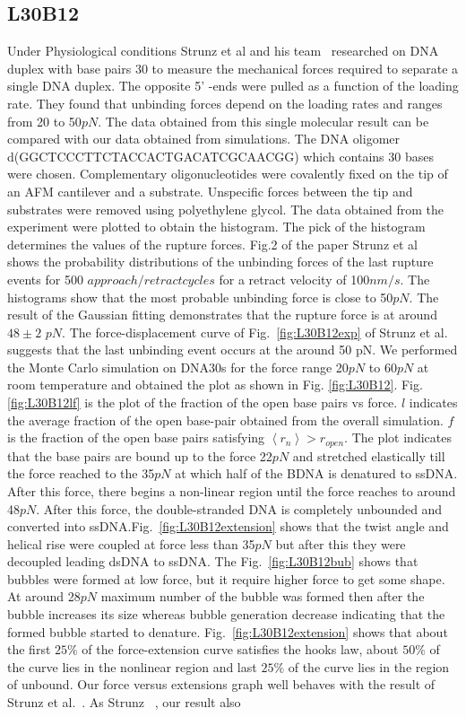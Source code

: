 \documentclass[12pt,masters,final]{UTRGVthesis}
\begin{document}
\subsection{L30B12}
  Under Physiological conditions Strunz et al and his team~\cite{Strunz:1999} researched on  DNA duplex with base pairs  30 to measure the mechanical forces required to separate a single DNA duplex. The opposite 5' -ends were pulled as a function of the loading rate. They found that unbinding forces depend on the loading rates and ranges from 20 to 50$pN$. The data obtained from this single molecular result can be compared with our data obtained from simulations. The DNA oligomer d(GGCTCCCTTCTACCACTGACATCGCAACGG) which contains 30 bases were chosen. Complementary oligonucleotides were covalently fixed on the tip of an AFM cantilever and a substrate. Unspecific forces between the tip and substrates were removed using polyethylene glycol. The data obtained from the experiment were plotted to obtain the histogram. The pick of the histogram determines the values of the rupture forces. Fig.2 of the paper Strunz et al~\cite{Strunz:1999} shows the probability distributions of the unbinding forces of the last rupture events for 500 $approach/retract cycles$ for a retract velocity of 100$nm/s$. The histograms show that the most probable unbinding force is close to 50$pN$. The result of the Gaussian fitting demonstrates that the rupture force is at around $48\pm2 $ $pN$. The force-displacement curve of Fig.~\ref{fig:L30B12exp} of Strunz et al.~\cite{Strunz:1999} suggests that the last unbinding event occurs at the around 50 pN. We performed the Monte Carlo simulation on DNA30s for the force range 20$pN$ to 60$pN$ at room temperature and obtained the plot as shown in Fig. \ref{fig:L30B12}. Fig.\ref{fig:L30B12lf} is the plot of the fraction of the open base pairs vs force. $l$ indicates the average fraction of the open base-pair obtained from the overall simulation. $f$ is the fraction of the open base pairs satisfying $\left<r_{n}\right> > r_{open}$. The plot indicates that the base pairs are bound up to the force 22$pN$ and stretched elastically till the force reached to the 35$pN$ at which half of the BDNA is denatured to ssDNA. After this force, there begins a non-linear region until the force reaches to around 48$pN$. After this force, the double-stranded DNA is completely unbounded and converted into ssDNA.Fig.~\ref{fig:L30B12extension} shows that the twist angle and helical rise were coupled at force less than 35$pN$ but after this they were decoupled leading dsDNA to ssDNA. The Fig.~\ref{fig:L30B12bub} shows that bubbles were formed  at low force, but it require higher force to get some shape. At around 28$pN$ maximum number of the bubble was formed then after the bubble increases its size whereas bubble generation decrease indicating that the formed bubble started to denature. Fig.~\ref{fig:L30B12extension} shows that about the first $25\%$ of the force-extension curve satisfies the hooks law, about $50\%$ of the curve lies in the nonlinear region and last $25\%$ of the curve lies in the region of unbound.  Our force versus extensions graph well behaves with the result of  Strunz et al.~\cite{Strunz:1999}. As Strunz ~\cite{Strunz:1999}, our result also 
\end{document}
